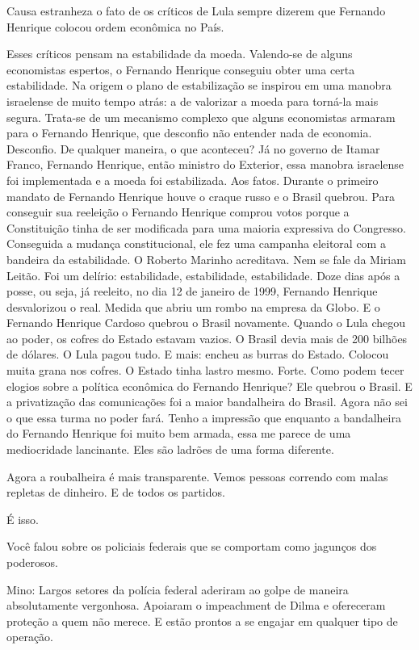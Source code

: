 \falaG Causa estranheza o fato de os críticos de Lula sempre dizerem que
Fernando Henrique colocou ordem econômica no País.

\falaM Esses críticos pensam na estabilidade da moeda. Valendo-se de alguns
economistas espertos, o Fernando Henrique conseguiu obter uma certa
estabilidade. Na origem o plano de estabilização se inspirou em uma
manobra israelense de muito tempo atrás: a de valorizar a moeda para
torná-la mais segura. Trata-se de um mecanismo complexo que alguns
economistas armaram para o Fernando Henrique, que desconfio não entender
nada de economia. Desconfio. De qualquer maneira, o que aconteceu? Já no
governo de Itamar Franco, Fernando Henrique, então ministro do Exterior,
essa manobra israelense foi implementada e a moeda foi estabilizada. Aos
fatos. Durante o primeiro mandato de Fernando Henrique houve o craque
russo e o Brasil quebrou. Para conseguir sua reeleição o Fernando
Henrique comprou votos porque a Constituição tinha de ser modificada
para uma maioria expressiva do Congresso. Conseguida a mudança
constitucional, ele fez uma campanha eleitoral com a bandeira da
estabilidade. O Roberto Marinho acreditava. Nem se fale da Miriam
Leitão. Foi um delírio: estabilidade, estabilidade, estabilidade. Doze
dias após a posse, ou seja, já reeleito, no dia 12 de janeiro de 1999,
Fernando Henrique desvalorizou o real. Medida que abriu um rombo na
empresa da Globo. E o Fernando Henrique Cardoso quebrou o Brasil
novamente. Quando o Lula chegou ao poder, os cofres do Estado estavam
vazios. O Brasil devia mais de 200 bilhões de dólares. O Lula pagou
tudo. E mais: encheu as burras do Estado. Colocou muita grana nos
cofres. O Estado tinha lastro mesmo. Forte. Como podem tecer elogios
sobre a política econômica do Fernando Henrique? Ele quebrou o Brasil. E
a privatização das comunicações foi a maior bandalheira do Brasil. Agora
não sei o que essa turma no poder fará. Tenho a impressão que enquanto a
bandalheira do Fernando Henrique foi muito bem armada, essa me parece de
uma mediocridade lancinante. Eles são ladrões de uma forma diferente.

\falaG Agora a roubalheira é mais transparente. Vemos pessoas correndo com
malas repletas de dinheiro. E de todos os partidos.

\falaM É isso.

\falaG Você falou sobre os policiais federais que se comportam como jagunços
dos poderosos.

Mino: Largos setores da polícia federal aderiram ao golpe de maneira
absolutamente vergonhosa. Apoiaram o impeachment de Dilma e ofereceram
proteção a quem não merece. E estão prontos a se engajar em qualquer
tipo de operação.

